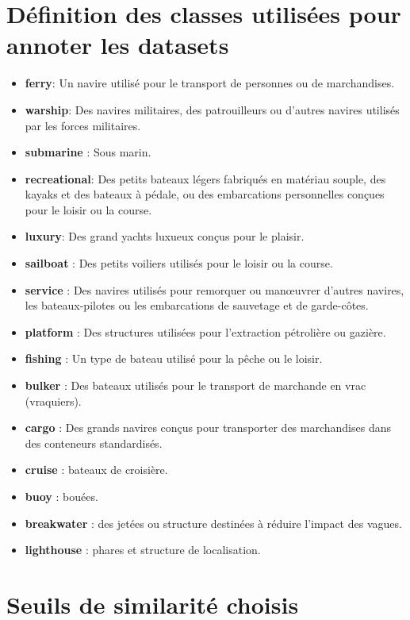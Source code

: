\pagebreak

\chapter{Définition des classes utilisées pour annoter les datasets}

\begin{itemize}
    \item \textbf{ferry}: Un navire utilisé pour le transport de personnes ou de marchandises.
    \item \textbf{warship}: Des navires militaires, des patrouilleurs ou d'autres navires utilisés par les forces militaires.
    \item \textbf{submarine} : Sous marin.
    \item \textbf{recreational}: Des petits bateaux légers fabriqués en matériau souple, des kayaks et des bateaux à pédale, ou des embarcations personnelles conçues pour le loisir ou la course.
    \item \textbf{luxury}: Des grand yachts luxueux conçus pour le plaisir.
    \item \textbf{sailboat} : Des petits voiliers utilisés pour le loisir ou la course.
    \item \textbf{service} : Des navires utilisés pour remorquer ou manœuvrer d'autres navires, les bateaux-pilotes ou les embarcations de sauvetage et de garde-côtes.
    \item \textbf{platform} : Des structures utilisées pour l'extraction pétrolière ou gazière.
    \item \textbf{fishing} : Un type de bateau utilisé pour la pêche ou le loisir.
    \item \textbf{bulker} : Des bateaux utilisés pour le transport de marchande en vrac (vraquiers).
    \item \textbf{cargo} : Des grands navires conçus pour transporter des marchandises dans des conteneurs standardisés.
    \item \textbf{cruise} : bateaux de croisière.
    \item \textbf{buoy} : bouées.
    \item \textbf{breakwater} : des jetées ou structure destinées à réduire l'impact des vagues.
    \item \textbf{lighthouse} : phares et structure de localisation.
\end{itemize}
\label{classes_annotations}

\pagebreak


\chapter{Seuils de similarité choisis}

